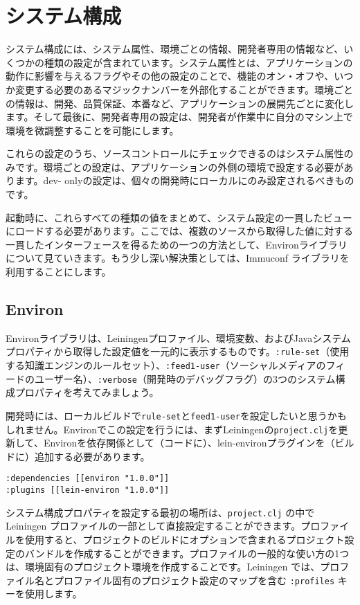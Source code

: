 \section{システム構成}

システム構成には、システム属性、環境ごとの情報、開発者専用の情報など、いくつかの種類の設定が含まれています。システム属性とは、アプリケーションの動作に影響を与えるフラグやその他の設定のことで、機能のオン・オフや、いつか変更する必要のあるマジックナンバーを外部化することができます。環境ごとの情報は、開発、品質保証、本番など、アプリケーションの展開先ごとに変化します。そして最後に、開発者専用の設定は、開発者が作業中に自分のマシン上で環境を微調整することを可能にします。

これらの設定のうち、ソースコントロールにチェックできるのはシステム属性のみです。環境ごとの設定は、アプリケーションの外側の環境で設定する必要があります。dev- onlyの設定は、個々の開発時にローカルにのみ設定されるべきものです。

起動時に、これらすべての種類の値をまとめて、システム設定の一貫したビューにロードする必要があります。ここでは、複数のソースから取得した値に対する一貫したインターフェースを得るための一つの方法として、Environライブラリについて見ていきます。もう少し深い解決策としては、Immuconf ライブラリを利用することにします。

\subsection{Environ}

Environライブラリは、Leiningenプロファイル、環境変数、およびJavaシステムプロパティから取得した設定値を一元的に表示するものです。\texttt{:rule-set}（使用する知識エンジンのルールセット）、\texttt{:feed1-user}（ソーシャルメディアのフィードのユーザー名）、\texttt{:verbose}（開発時のデバッグフラグ）の3つのシステム構成プロパティを考えてみましょう。

開発時には、ローカルビルドで\texttt{rule-set}と\texttt{feed1-user}を設定したいと思うかもしれません。Environでこの設定を行うには、まずLeiningenの\texttt{project.clj}を更新して、Environを依存関係として（コードに）、lein-environプラグインを（ビルドに）追加する必要があります。


\begin{lstlisting}[numbers=none]
:dependencies [[environ "1.0.0"]]
:plugins [[lein-environ "1.0.0"]]
\end{lstlisting}

システム構成プロパティを設定する最初の場所は、\texttt{project.clj} の中で Leiningen プロファイルの一部として直接設定することができます。プロファイルを使用すると、プロジェクトのビルドにオプションで含まれるプロジェクト設定のバンドルを作成することができます。プロファイルの一般的な使い方の1つは、環境固有のプロジェクト環境を作成することです。Leiningen では、プロファイル名とプロファイル固有のプロジェクト設定のマップを含む \texttt{:profiles} キーを使用します。

